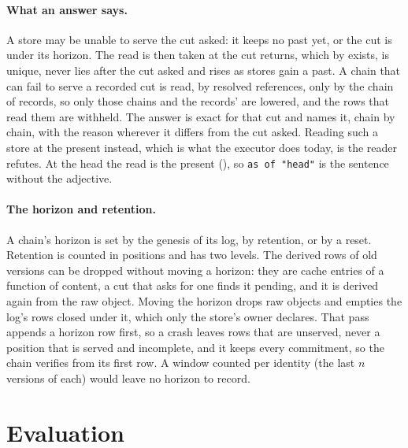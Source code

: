 \documentclass[11pt]{article}
\theoremstyle{plain}
\theoremstyle{definition}
\begin{document}
\paragraph{What an answer says.}
A store may be unable to serve the cut asked: it keeps no past yet, or the cut is under its
horizon. The read is then taken at the cut  returns, which by
 exists, is unique, never lies after the cut asked and rises as stores gain a
past. A chain that can fail to serve a recorded cut is read, by resolved references, only by
the chain of records, so only those chains and the records' are lowered, and the rows that read
them are withheld. The answer is exact for that cut and names it, chain by chain, with
the reason wherever it differs from the cut asked. Reading such a store at the present instead, which is what the
executor does today, is the reader  refutes. At the head the read is the
present (), so \texttt{as of "head"} is the sentence without the adjective.

\paragraph{The horizon and retention.}
A chain's horizon is set by the genesis of its log, by retention, or by a reset. Retention is
counted in positions and has two levels. The derived rows of old versions can be dropped without
moving a horizon: they are cache entries of a function of content, a cut that asks for one finds
it pending, and it is derived again from the raw object. Moving the horizon drops raw objects
and empties the log's rows closed under it, which only the store's owner declares. That pass
appends a horizon row first, so a crash leaves rows that are unserved, never a position that is
served and incomplete, and it keeps every commitment, so the chain verifies from its first row. A window counted per identity (the last $n$
versions of each) would leave no horizon to record.

\section{Evaluation}\label{sec:eval}
\end{document}
